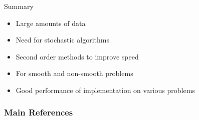 \documentclass[10pt]{beamer}
\begin{document}
  \begin{frame}{Summary}
    \begin{itemize}
    	\item Large amounts of data
    	\item Need for stochastic algorithms
    	\item Second order methods to improve speed
    	\item For smooth and non-smooth problems
    	\item Good performance of implementation on various problems
    \end{itemize}
  \end{frame}


  \begin{frame}[allowframebreaks]\frametitle{Main References}

    
    

  \end{frame}
\end{document}
